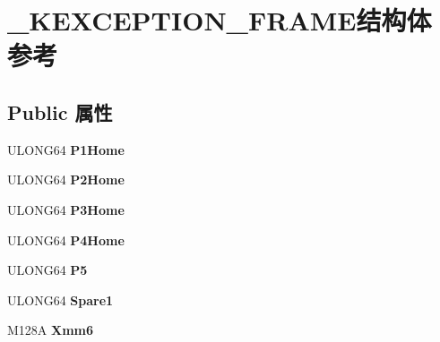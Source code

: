 \hypertarget{struct___k_e_x_c_e_p_t_i_o_n___f_r_a_m_e}{}\section{\+\_\+\+K\+E\+X\+C\+E\+P\+T\+I\+O\+N\+\_\+\+F\+R\+A\+M\+E结构体 参考}
\label{struct___k_e_x_c_e_p_t_i_o_n___f_r_a_m_e}
\subsection*{Public 属性}
\begin{DoxyCompactItemize}
\item 
\mbox{\label{struct___k_e_x_c_e_p_t_i_o_n___f_r_a_m_e_a56df63c6eb34a164e3281ceec0ff4084}} 
U\+L\+O\+N\+G64 {\bfseries P1\+Home}
\item 
\mbox{\label{struct___k_e_x_c_e_p_t_i_o_n___f_r_a_m_e_ad9873e2082703fae5eaeea8570149088}} 
U\+L\+O\+N\+G64 {\bfseries P2\+Home}
\item 
\mbox{\label{struct___k_e_x_c_e_p_t_i_o_n___f_r_a_m_e_a569e3dee88d8afe252a329bbb0308316}} 
U\+L\+O\+N\+G64 {\bfseries P3\+Home}
\item 
\mbox{\label{struct___k_e_x_c_e_p_t_i_o_n___f_r_a_m_e_a8bc22a2a38aa92827b5429ed2421bd2c}} 
U\+L\+O\+N\+G64 {\bfseries P4\+Home}
\item 
\mbox{\label{struct___k_e_x_c_e_p_t_i_o_n___f_r_a_m_e_a27104f0f27972f1a1a936f5895e0f8ff}} 
U\+L\+O\+N\+G64 {\bfseries P5}
\item 
\mbox{\label{struct___k_e_x_c_e_p_t_i_o_n___f_r_a_m_e_af9593cac90f904908f40722c60a24ae5}} 
U\+L\+O\+N\+G64 {\bfseries Spare1}
\item 
\mbox{\label{struct___k_e_x_c_e_p_t_i_o_n___f_r_a_m_e_a213e6a9b84bf7e3b2e7b1ee6e15f3692}} 
M128A {\bfseries Xmm6}
\item 
\mbox{\label{struct___k_e_x_c_e_p_t_i_o_n___f_r_a_m_e_a2f124e867cfc57fe81046d14054924f3}} 

\end{DoxyCompactItemize}
